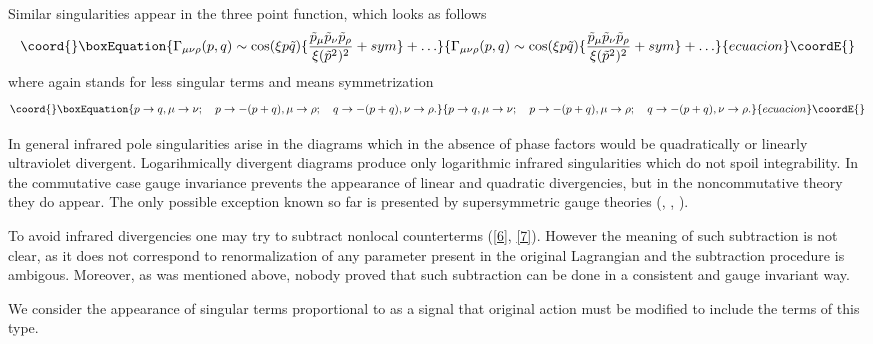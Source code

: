 \documentclass[a4paper,12pt]{article}
\begin{document}
 Similar singularities appear in the three point function, which looks as
 follows
 \begin{equation}\coord{}\boxEquation{
 \Gamma_{\mu \nu \rho}(p,q) \sim \cos(\xi p \tilde{q})
 \{ \frac{ \tilde{p}_{\mu} \tilde{p}_{\nu}  \tilde{p}_{\rho}}
{\xi(\tilde{p}^2)^2}+ sym \}+ \ldots
 \label{7}
 }{
 \Gamma_{\mu \nu \rho}(p,q) \sim \cos(\xi p \tilde{q})
 \{ \frac{ \tilde{p}_{\mu} \tilde{p}_{\nu}  \tilde{p}_{\rho}}
{\xi(\tilde{p}^2)^2}+ sym \}+ \ldots
 }{ecuacion}\coordE{}\end{equation}
 where \myHighlight{$\ldots$}\coordHE{} again stands for less singular terms and \coordHE{} means
  symmetrization
 \begin{equation}\coord{}\boxEquation{
 p \rightarrow q,\mu \rightarrow \nu;\quad p \rightarrow -(p+q), \mu
  \rightarrow \rho; \quad q \rightarrow -(p+q), \nu \rightarrow \rho.
 \label{8}
 }{
 p \rightarrow q,\mu \rightarrow \nu;\quad p \rightarrow -(p+q), \mu
  \rightarrow \rho; \quad q \rightarrow -(p+q), \nu \rightarrow \rho.
 }{ecuacion}\coordE{}\end{equation}

In general infrared pole singularities arise in the diagrams which in the
  absence of phase factors would be quadratically or linearly ultraviolet
 divergent. Logarihmically divergent diagrams produce only logarithmic
 infrared singularities which do not spoil integrability. In the
 commutative case gauge invariance prevents the appearance of linear and
 quadratic divergencies, but in the noncommutative theory they do appear.
 The only possible exception known so far is presented by supersymmetric
 gauge theories (\cite{SJ}, \cite{Z}, \cite{J-J}).

To avoid infrared divergencies one may try to subtract nonlocal
counterterms (\ref{6}, \ref{7}). However the meaning of such subtraction
 is not clear, as it does not correspond to renormalization of any
 parameter present in the original Lagrangian and the subtraction
 procedure is ambigous. Moreover, as was mentioned above, nobody proved
 that such subtraction can be done in a consistent and gauge invariant
 way.

 We consider the appearance of singular terms proportional to \coordHE{} as a signal that original action must be
 modified to include the terms of this type.
\end{document}

